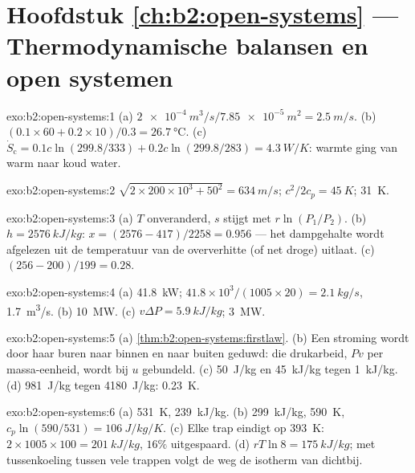 \section*{Hoofdstuk \ref{ch:b2:open-systems} --- Thermodynamische balansen
en open systemen}

\begin{solution}{exo:b2:open-systems:1}
(a) $\qty{2e-4}{m^3/s}/\qty{7.85e-5}{m^2} = \qty{2.5}{m/s}$. (b)
$(0.1 \times 60 + 0.2
\times 10)/0.3 = \qty{26.7}{\celsius}$. (c)
$\dot S_{\text{c}} = 0.1c\ln(299.8/333) +
0.2c\ln(299.8/283) = \qty{4.3}{W/K}$:
warmte ging van warm naar koud water.
\end{solution}

\begin{solution}{exo:b2:open-systems:2}
$\sqrt{2 \times 200 \times 10^3 + 50^2} = \qty{634}{m/s}$; $c^2/2c_p = \qty{45}{K}$;
\qty{31}{K}.
\end{solution}

\begin{solution}{exo:b2:open-systems:3}
(a) $T$ onveranderd, $s$ stijgt met $r\ln(P_1/P_2)$. (b) $h = \qty{2576}{kJ/kg}$:
$x = (2576 - 417)/2258 = 0.956$ --- het dampgehalte wordt afgelezen uit de
temperatuur van de oververhitte (of net droge) uitlaat. (c)
$(256 -
200)/199 = 0.28$.
\end{solution}

\begin{solution}{exo:b2:open-systems:4}
(a) \qty{41.8}{kW}; $41.8 \times 10^3/(1005 \times 20) = \qty{2.1}{kg/s}$,
\qty{1.7}{m^3/s}.
(b) \qty{10}{MW}. (c) $v\Delta P = \qty{5.9}{kJ/kg}$; \qty{3}{MW}.
\end{solution}

\begin{solution}{exo:b2:open-systems:5}
(a) \cref{thm:b2:open-systems:firstlaw}. (b) Een stroming wordt door haar buren
naar binnen en naar buiten geduwd: die drukarbeid, $Pv$ per massa-eenheid, wordt
bij $u$ gebundeld. (c) \qty{50}{J/kg} en \qty{45}{kJ/kg} tegen \qty{1}{kJ/kg}.
(d) \qty{981}{J/kg} tegen \qty{4180}{J/kg}: \qty{0.23}{K}.
\end{solution}

\begin{solution}{exo:b2:open-systems:6}
(a) \qty{531}{K}, \qty{239}{kJ/kg}. (b) \qty{299}{kJ/kg}, \qty{590}{K},
$c_p\ln(590/531)
= \qty{106}{J/kg/K}$. (c) Elke trap eindigt op
\qty{393}{K}: $2 \times 1005 \times 100 =
\qty{201}{kJ/kg}$, $16\%$
uitgespaard. (d) $rT\ln 8 = \qty{175}{kJ/kg}$; met
tussenkoeling tussen vele trappen volgt de weg de isotherm van dichtbij.
\end{solution}

